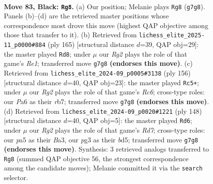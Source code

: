 \documentclass[11pt]{article}
\begin{document}
\clearpage

\begin{figure}[p]\centering
\begin{subfigure}{0.46\textwidth}\centering
\resizebox{\linewidth}{!}{%
\newchessgame
\chessboard[
  setfen={8/3k2r1/p7/Ppp2p1p/2p2P1P/4PKP1/1P6/5R2 b - - 12 83},
  showmover=false,
  pgfstyle=straightmove, color=movearrow, markmove={g7-g8}
]}
\caption{}
\end{subfigure}\hfill
\begin{subfigure}{0.46\textwidth}\centering
\resizebox{\linewidth}{!}{%
\newchessgame
\chessboard[
  setfen={4r3/1p6/p1p2kp1/P6p/1P3P1P/4PK2/2R5/8 b - - 2 83},
  showmover=false,
  pgfstyle=straightmove, color=movearrow, markmove={e8-d8}
]}
\caption{}
\end{subfigure}
\\[4pt]
\begin{subfigure}{0.46\textwidth}\centering
\resizebox{\linewidth}{!}{%
\newchessgame
\chessboard[
  setfen={8/1r5p/2R3pP/4kpP1/4p3/4P3/5PK1/8 w - - 42 79},
  showmover=false,
  pgfstyle=straightmove, color=movearrow, markmove={c6-c5}
]}
\caption{}
\end{subfigure}\hfill
\begin{subfigure}{0.46\textwidth}\centering
\resizebox{\linewidth}{!}{%
\newchessgame
\chessboard[
  setfen={2r3k1/3R1p1p/4p1pP/K2bP1P1/p7/B5P1/8/8 w - - 35 75},
  showmover=false,
  pgfstyle=straightmove, color=movearrow, markmove={d7-d6}
]}
\caption{}
\end{subfigure}
\caption{\textbf{Move 83, Black: \texttt{Rg8}.} (a) Our position; Melanie plays \texttt{Rg8} (\texttt{g7g8}). Panels (b)--(d) are the retrieved master positions whose correspondence most drove this move (highest QAP objective among those that transfer to it). (b) Retrieved from \texttt{lichess\_elite\_2025-11\_p0000\#884} (ply 165) [structural distance $d$=39, QAP obj=29]: the master played \texttt{Rd8}; under $\mu$ our \emph{Rg2} plays the role of that game's \emph{Re1}; transferred move \texttt{g7g8} \textbf{(endorses this move)}. (c) Retrieved from \texttt{lichess\_elite\_2024-09\_p0005\#3138} (ply 156) [structural distance $d$=40, QAP obj=23]: the master played \texttt{Rc5+}; under $\mu$ our \emph{Rg2} plays the role of that game's \emph{Rc6}; cross-type roles: our \emph{P}a6 as their \emph{r}b7; transferred move \texttt{g7g8} \textbf{(endorses this move)}. (d) Retrieved from \texttt{lichess\_elite\_2024-09\_p0020\#1221} (ply 148) [structural distance $d$=40, QAP obj=5]: the master played \texttt{Rd6}; under $\mu$ our \emph{Rg2} plays the role of that game's \emph{Rd7}; cross-type roles: our \emph{p}a5 as their \emph{B}a3, our \emph{p}g3 as their \emph{b}d5; transferred move \texttt{g7g8} \textbf{(endorses this move)}. Synthesis: 3 retrieved analogs transferred to \texttt{Rg8} (summed QAP objective 56, the strongest correspondence among the candidate moves); Melanie committed it via the \texttt{search} selector.}
\label{fig:thought-m165}
\end{figure}
\end{document}
